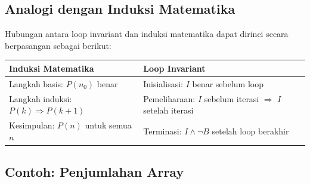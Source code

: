 \subsection{Analogi dengan Induksi Matematika}

Hubungan antara loop invariant dan induksi matematika dapat dirinci secara berpasangan sebagai berikut:

\begin{center}
\renewcommand{\arraystretch}{1.3}
\begin{tabular}{|>{\raggedright\arraybackslash}p{5cm}|>{\raggedright\arraybackslash}p{5cm}|}
\hline
\textbf{Induksi Matematika} & \textbf{Loop Invariant} \\ \hline
Langkah basis: $P(n_0)$ benar & Inisialisasi: $I$ benar sebelum loop \\ \hline
Langkah induksi: $P(k) \Rightarrow P(k+1)$ & Pemeliharaan: $I$ sebelum iterasi $\Rightarrow$ $I$ setelah iterasi \\ \hline
Kesimpulan: $P(n)$ untuk semua $n$ & Terminasi: $I \wedge \neg B$ setelah loop berakhir \\ \hline
\end{tabular}
\end{center}

\subsection{Contoh: Penjumlahan Array}

